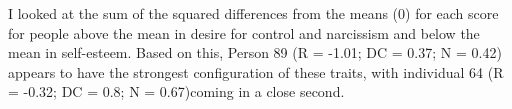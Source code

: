 \documentclass[]{article}
\begin{document}
I looked at the sum of the squared differences from the means (0) for
each score for people above the mean in desire for control and
narcissism and below the mean in self-esteem. Based on this, Person 89
(R = -1.01; DC = 0.37; N = 0.42) appears to have the strongest
configuration of these traits, with individual 64 (R = -0.32; DC = 0.8;
N = 0.67)coming in a close second.
\end{document}
